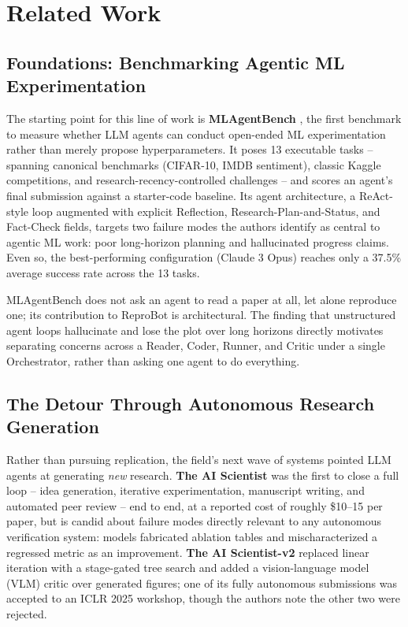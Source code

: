 \documentclass[11pt]{article}
\begin{document}
\section{Related Work}
\label{sec:related}

\subsection{Foundations: Benchmarking Agentic ML Experimentation}

The starting point for this line of work is \textbf{MLAgentBench}
\cite{huang2023mlagentbench}, the first benchmark to measure whether LLM agents can
conduct open-ended ML experimentation rather than merely propose hyperparameters. It
poses 13 executable tasks -- spanning canonical benchmarks (CIFAR-10, IMDB sentiment),
classic Kaggle competitions, and research-recency-controlled challenges -- and scores an
agent's final submission against a starter-code baseline. Its agent architecture, a
ReAct-style loop augmented with explicit Reflection, Research-Plan-and-Status, and
Fact-Check fields, targets two failure modes the authors identify as central to agentic
ML work: poor long-horizon planning and hallucinated progress claims. Even so, the
best-performing configuration (Claude 3 Opus) reaches only a 37.5\% average success rate
across the 13 tasks.

MLAgentBench does not ask an agent to read a paper at all, let alone reproduce one; its
contribution to ReproBot is architectural. The finding that unstructured agent loops
hallucinate and lose the plot over long horizons directly motivates separating concerns
across a Reader, Coder, Runner, and Critic under a single Orchestrator, rather than
asking one agent to do everything.

\subsection{The Detour Through Autonomous Research Generation}

Rather than pursuing replication, the field's next wave of systems pointed LLM agents at
generating \emph{new} research. \textbf{The AI Scientist} \cite{lu2024aiscientist} was
the first to close a full loop -- idea generation, iterative experimentation, manuscript
writing, and automated peer review -- end to end, at a reported cost of roughly \$10--15
per paper, but is candid about failure modes directly relevant to any autonomous
verification system: models fabricated ablation tables and mischaracterized a regressed
metric as an improvement. \textbf{The AI Scientist-v2} \cite{yamada2025aiscientistv2}
replaced linear iteration with a stage-gated tree search and added a vision-language
model (VLM) critic over generated figures; one of its fully autonomous submissions was
accepted to an ICLR 2025 workshop, though the authors note the other two were rejected.
\end{document}
